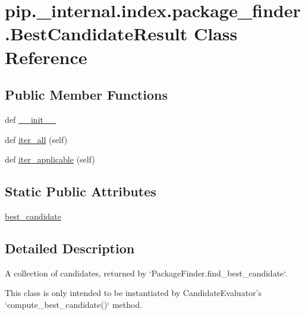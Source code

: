 \hypertarget{classpip_1_1__internal_1_1index_1_1package__finder_1_1BestCandidateResult}{}\section{pip.\+\_\+internal.\+index.\+package\+\_\+finder.\+Best\+Candidate\+Result Class Reference}
\label{classpip_1_1__internal_1_1index_1_1package__finder_1_1BestCandidateResult}
\subsection*{Public Member Functions}
\begin{DoxyCompactItemize}
\item 
def \hyperlink{classpip_1_1__internal_1_1index_1_1package__finder_1_1BestCandidateResult_ac992b6c917c003ae805241c66486dfbd}{\+\_\+\+\_\+init\+\_\+\+\_\+}
\item 
def \hyperlink{classpip_1_1__internal_1_1index_1_1package__finder_1_1BestCandidateResult_acb8c529e90d0b6b21025d01a15ac94fa}{iter\+\_\+all} (self)
\item 
def \hyperlink{classpip_1_1__internal_1_1index_1_1package__finder_1_1BestCandidateResult_abce2168d5dbea0e82a8f3d1541a6c675}{iter\+\_\+applicable} (self)
\end{DoxyCompactItemize}
\subsection*{Static Public Attributes}
\begin{DoxyCompactItemize}
\item 
\hyperlink{classpip_1_1__internal_1_1index_1_1package__finder_1_1BestCandidateResult_ad0542331fb440a3ae9749d49d09242ef}{best\+\_\+candidate}
\end{DoxyCompactItemize}


\subsection{Detailed Description}
\begin{DoxyVerb}A collection of candidates, returned by `PackageFinder.find_best_candidate`.

This class is only intended to be instantiated by CandidateEvaluator's
`compute_best_candidate()` method.
\end{DoxyVerb}
 

